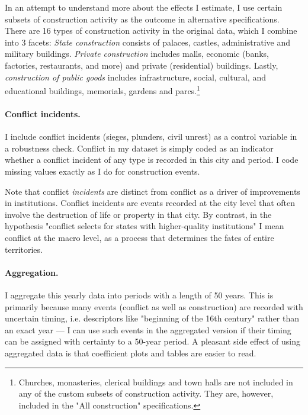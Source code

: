 \documentclass[11pt, a4paper]{article}
\begin{document}
In an attempt to understand more about the effects I estimate, I use certain subsets of construction activity as the outcome in alternative specifications. There are 16 types of construction activity in the original data, which I combine into 3 facets: \textit{State construction} consists of palaces, castles, administrative and military buildings. \textit{Private construction} includes malls, economic (banks, factories, restaurants, and more) and private (residential) buildings. Lastly, \textit{construction of public goods} includes infrastructure, social, cultural, and educational buildings, memorials, gardens and parcs.\footnote
{
Churches, monasteries, clerical buildings and town halls are not included in any of the custom subsets of construction activity. They are, however, included in the "All construction" specifications.
}


\paragraph{Conflict incidents.}

I include conflict incidents (sieges, plunders, civil unrest) as a control variable in a robustness check. Conflict in my dataset is simply coded as an indicator whether a conflict incident of any type is recorded in this city and period. I code missing values exactly as I do for construction events.

Note that conflict \textit{incidents} are distinct from conflict as a driver of improvements in institutions. Conflict incidents are events recorded at the city level that often involve the destruction of life or property in that city. By contrast, in the hypothesis "conflict selects for states with higher-quality institutions" I mean conflict at the macro level, as a process that determines the fates of entire territories.

\paragraph{Aggregation.}

I aggregate this yearly data into periods with a length of 50 years. This is primarily because many events (conflict as well as construction) are recorded with uncertain timing, i.e. descriptors like "beginning of the 16th century" rather than an exact year --- I can use such events in the aggregated version if their timing can be assigned with certainty to a 50-year period. A pleasant side effect of using aggregated data is that coefficient plots and tables are easier to read.
\end{document}
